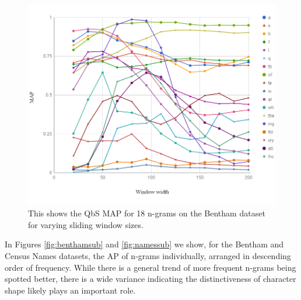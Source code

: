 \documentclass[ms,electronic,twosidetoc,letterpaper,chaptercenter,parttop,lol,lof,lot]{byumsphd}
\begin{document}
\begin{figure}
    \centering
    \includegraphics[width=.98\textwidth]{windowsizes}
    \caption{This shows the QbS MAP for 18 n-grams on the Bentham dataset for varying sliding window sizes.
    }
    \label{fig:windowsizes}
\end{figure}

In Figures \ref{fig:benthamsub} and \ref{fig:namessub} we show, for the Bentham and Census Names datasets, the AP of n-grams individually, arranged in descending order of frequency. While there is a general trend of more frequent n-grams being spotted better, there is a wide variance indicating the distinctiveness of character shape likely plays an important role. 
\end{document}
